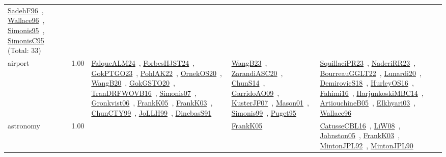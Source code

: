 {\begin{longtable}{p{3cm}r>{\raggedright\arraybackslash}p{6cm}>{\raggedright\arraybackslash}p{6cm}>{\raggedright\arraybackslash}p{8cm}}
\href{../works/SadehF96.pdf}{SadehF96}~\cite{SadehF96}, \href{../works/Wallace96.pdf}{Wallace96}~\cite{Wallace96}, \href{../works/Simonis95.pdf}{Simonis95}~\cite{Simonis95}, \href{../works/SimonisC95.pdf}{SimonisC95}~\cite{SimonisC95} (Total: 33)\\
\index{airport}\index{ApplicationAreas!airport}airport &  1.00 & \href{../works/FalqueALM24.pdf}{FalqueALM24}~\cite{FalqueALM24}, \href{../works/ForbesHJST24.pdf}{ForbesHJST24}~\cite{ForbesHJST24}, \href{../works/GokPTGO23.pdf}{GokPTGO23}~\cite{GokPTGO23}, \href{../works/PohlAK22.pdf}{PohlAK22}~\cite{PohlAK22}, \href{../works/OrnekOS20.pdf}{OrnekOS20}~\cite{OrnekOS20}, \href{../works/WangB20.pdf}{WangB20}~\cite{WangB20}, \href{../works/GokGSTO20.pdf}{GokGSTO20}~\cite{GokGSTO20}, \href{../works/TranDRFWOVB16.pdf}{TranDRFWOVB16}~\cite{TranDRFWOVB16}, \href{../works/Simonis07.pdf}{Simonis07}~\cite{Simonis07}, \href{../works/Gronkvist06.pdf}{Gronkvist06}~\cite{Gronkvist06}, \href{../works/FrankK05.pdf}{FrankK05}~\cite{FrankK05}, \href{../works/FrankK03.pdf}{FrankK03}~\cite{FrankK03}, \href{../works/ChunCTY99.pdf}{ChunCTY99}~\cite{ChunCTY99}, \href{../works/JoLLH99.pdf}{JoLLH99}~\cite{JoLLH99}, \href{../works/DincbasS91.pdf}{DincbasS91}~\cite{DincbasS91} & \href{../works/WangB23.pdf}{WangB23}~\cite{WangB23}, \href{../works/ZarandiASC20.pdf}{ZarandiASC20}~\cite{ZarandiASC20}, \href{../works/ChunS14.pdf}{ChunS14}~\cite{ChunS14}, \href{../works/GarridoAO09.pdf}{GarridoAO09}~\cite{GarridoAO09}, \href{../works/KusterJF07.pdf}{KusterJF07}~\cite{KusterJF07}, \href{../works/Mason01.pdf}{Mason01}~\cite{Mason01}, \href{../works/Simonis99.pdf}{Simonis99}~\cite{Simonis99}, \href{../works/Puget95.pdf}{Puget95}~\cite{Puget95} & \href{../works/SquillaciPR23.pdf}{SquillaciPR23}~\cite{SquillaciPR23}, \href{../works/NaderiRR23.pdf}{NaderiRR23}~\cite{NaderiRR23}, \href{../works/BourreauGGLT22.pdf}{BourreauGGLT22}~\cite{BourreauGGLT22}, \href{../works/Lunardi20.pdf}{Lunardi20}~\cite{Lunardi20}, \href{../works/DemirovicS18.pdf}{DemirovicS18}~\cite{DemirovicS18}, \href{../works/HurleyOS16.pdf}{HurleyOS16}~\cite{HurleyOS16}, \href{../works/Fahimi16.pdf}{Fahimi16}~\cite{Fahimi16}, \href{../works/HarjunkoskiMBC14.pdf}{HarjunkoskiMBC14}~\cite{HarjunkoskiMBC14}, \href{../works/ArtiouchineB05.pdf}{ArtiouchineB05}~\cite{ArtiouchineB05}, \href{../works/Elkhyari03.pdf}{Elkhyari03}~\cite{Elkhyari03}, \href{../works/Wallace96.pdf}{Wallace96}~\cite{Wallace96}\\
\index{astronomy}\index{ApplicationAreas!astronomy}astronomy &  1.00 &  & \href{../works/FrankK05.pdf}{FrankK05}~\cite{FrankK05} & \href{../works/CatusseCBL16.pdf}{CatusseCBL16}~\cite{CatusseCBL16}, \href{../works/LiW08.pdf}{LiW08}~\cite{LiW08}, \href{../works/Johnston05.pdf}{Johnston05}~\cite{Johnston05}, \href{../works/FrankK03.pdf}{FrankK03}~\cite{FrankK03}, \href{../works/MintonJPL92.pdf}{MintonJPL92}~\cite{MintonJPL92}, \href{../works/MintonJPL90.pdf}{MintonJPL90}~\cite{MintonJPL90}\\

\end{longtable}}
